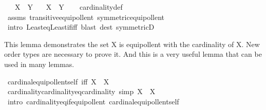 \begin{isabellebody}
\ \ \ {\isachardoublequoteopen}X\ {\isasymapprox}\ Y{\isachardoublequoteclose}\isanewline
\ \ \ {\isachardoublequoteopen}{\isacharbar}{\kern0pt}X{\isacharbar}{\kern0pt}\ {\isacharequal}{\kern0pt}\ {\isacharbar}{\kern0pt}Y{\isacharbar}{\kern0pt}{\isachardoublequoteclose}\isanewline
%
\isadelimproof
\ \ %
\endisadelimproof
%
\isatagproof
{}\isamarkupfalse%
\ cardinality{\isacharunderscore}{\kern0pt}def\ \isamarkupfalse%
\ assms\ transitive{\isacharunderscore}{\kern0pt}equipollent\ symmetric{\isacharunderscore}{\kern0pt}equipollent\isanewline
\ \ \isamarkupfalse%
\ {\isacharparenleft}{\kern0pt}intro\ Least{\isacharunderscore}{\kern0pt}eq{\isacharunderscore}{\kern0pt}Least{\isacharunderscore}{\kern0pt}if{\isacharunderscore}{\kern0pt}iff{\isacharparenright}{\kern0pt}\ {\isacharparenleft}{\kern0pt}blast\ dest{\isacharcolon}{\kern0pt}\ symmetricD{\isacharparenright}{\kern0pt}%
\endisatagproof
{\isafoldproof}%
%
\isadelimproof
%
\endisadelimproof
%
\begin{isamarkuptext}%
This lemma demonstrates the set X is equipollent with the cardinality of X.
New order types are necessary to prove it. And this is a very useful lemma that can be used 
in many lemmas.%
\end{isamarkuptext}\isamarkuptrue%
\isamarkupfalse%
\ cardinal{\isacharunderscore}{\kern0pt}equipollent{\isacharunderscore}{\kern0pt}self\ {\isacharbrackleft}{\kern0pt}iff{\isacharbrackright}{\kern0pt}{\isacharcolon}{\kern0pt}\ {\isachardoublequoteopen}{\isacharbar}{\kern0pt}X{\isacharbar}{\kern0pt}\ {\isasymapprox}\ X{\isachardoublequoteclose}\isanewline
\ \ \isanewline
%
\isadelimproof
\ \ %
\endisadelimproof
%
\isatagproof
{}\isamarkupfalse%
%
\endisatagproof
{\isafoldproof}%
%
\isadelimproof
\isanewline
%
\endisadelimproof
\isanewline
{}\isamarkupfalse%
\ cardinality{\isacharunderscore}{\kern0pt}cardinality{\isacharunderscore}{\kern0pt}eq{\isacharunderscore}{\kern0pt}cardinality\ {\isacharbrackleft}{\kern0pt}simp{\isacharbrackright}{\kern0pt}{\isacharcolon}{\kern0pt}\ {\isachardoublequoteopen}{\isacharbar}{\kern0pt}{\isacharbar}{\kern0pt}X{\isacharbar}{\kern0pt}{\isacharbar}{\kern0pt}\ {\isacharequal}{\kern0pt}\ {\isacharbar}{\kern0pt}X{\isacharbar}{\kern0pt}{\isachardoublequoteclose}\isanewline
%
\isadelimproof
\ \ %
\endisadelimproof
%
\isatagproof
{}\isamarkupfalse%
\ {\isacharparenleft}{\kern0pt}intro\ cardinality{\isacharunderscore}{\kern0pt}eq{\isacharunderscore}{\kern0pt}if{\isacharunderscore}{\kern0pt}equipollent\ cardinal{\isacharunderscore}{\kern0pt}equipollent{\isacharunderscore}{\kern0pt}self{\isacharparenright}{\kern0pt}%

\end{isabellebody}
